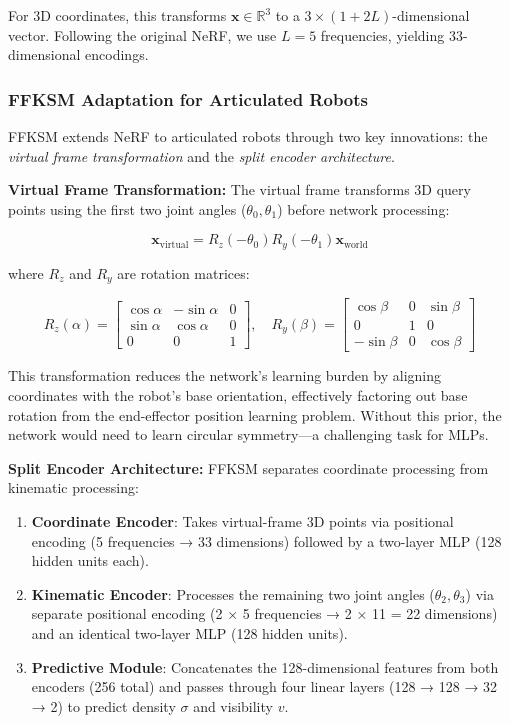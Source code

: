 \documentclass[12pt,a4paper,oneside]{report}
\begin{document}
For 3D coordinates, this transforms $\mathbf{x} \in \mathbb{R}^3$ to a $3 \times (1 + 2L)$-dimensional vector. Following the original NeRF, we use $L = 5$ frequencies, yielding 33-dimensional encodings.

\subsubsection{FFKSM Adaptation for Articulated Robots}
\label{subsubsec:ffksm_adaptation_for_articulated_robots}

FFKSM extends NeRF to articulated robots through two key innovations: the \textit{virtual frame transformation} and the \textit{split encoder architecture}.

\textbf{Virtual Frame Transformation:} The virtual frame transforms 3D query points using the first two joint angles ($\theta_0, \theta_1$) before network processing:

\begin{equation}
\mathbf{x}_{\text{virtual}} = R_z(-\theta_0) R_y(-\theta_1) \mathbf{x}_{\text{world}}
\end{equation}

where $R_z$ and $R_y$ are rotation matrices:

\begin{equation}
R_z(\alpha) = \begin{bmatrix}
\cos\alpha & -\sin\alpha & 0 \\
\sin\alpha & \cos\alpha & 0 \\
0 & 0 & 1
\end{bmatrix}, \quad
R_y(\beta) = \begin{bmatrix}
\cos\beta & 0 & \sin\beta \\
0 & 1 & 0 \\
-\sin\beta & 0 & \cos\beta
\end{bmatrix}
\end{equation}

This transformation reduces the network's learning burden by aligning coordinates with the robot's base orientation, effectively factoring out base rotation from the end-effector position learning problem. Without this prior, the network would need to learn circular symmetry—a challenging task for MLPs.

\textbf{Split Encoder Architecture:} FFKSM separates coordinate processing from kinematic processing:

\begin{enumerate}
    \item \textbf{Coordinate Encoder}: Takes virtual-frame 3D points via positional encoding (5 frequencies → 33 dimensions) followed by a two-layer MLP (128 hidden units each).
    \item \textbf{Kinematic Encoder}: Processes the remaining two joint angles ($\theta_2, \theta_3$) via separate positional encoding (2 × 5 frequencies → 2 × 11 = 22 dimensions) and an identical two-layer MLP (128 hidden units).
    \item \textbf{Predictive Module}: Concatenates the 128-dimensional features from both encoders (256 total) and passes through four linear layers (128 → 128 → 32 → 2) to predict density $\sigma$ and visibility $v$.
\end{enumerate}
\end{document}
